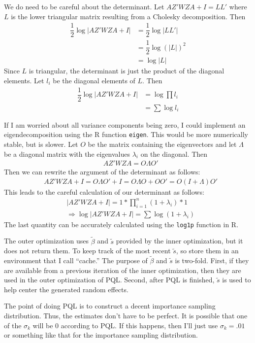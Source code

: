 \documentclass{article}
\begin{document}
We do need to be careful about the determinant. Let $AZ' W ZA +I= LL'$ where $L$ is the lower triangular matrix resulting from a Cholesky decomposition. Then
\begin{align}
\dfrac{1}{2} \log | AZ' W ZA +I | &= \dfrac{1}{2} \log |LL'|\\
&=\dfrac{1}{2} \log (|L|)^2 \\
&= \log |L|
\end{align}
Since $L$ is triangular, the determinant is just the product of the diagonal elements. Let $l_i$ be the diagonal elements of $L$. Then
\begin{align}
\dfrac{1}{2} \log | AZ' W ZA +I | &= \log \prod l_i \\
&= \sum \log l_i
\end{align}

 If I am worried about all variance components being zero, I could implement an eigendecomposition using the R function \texttt{eigen}. This would be more numerically stable, but is slower. Let $O$ be the matrix containing the eigenvectors and let $\Lambda$ be a diagonal matrix with the eigenvalues $\lambda_i$ on the diagonal. Then
\begin{align}
 &AZ' W ZA = O \Lambda O' 
\end{align}
Then we can rewrite the argument of the determinant as follows:
\begin{align}
& AZ' W ZA +I  = O \Lambda O' + I = O \Lambda O + OO'=O (I+\Lambda) O' 
\end{align}
This leads to the careful calculation of our determinant as follows:
\begin{align}
&   \left| AZ' W ZA +I \right| = 1 *  \prod_{i=1}^n (1+\lambda_i) *1\\
&\Rightarrow \log   | AZ' W ZA +I | = \sum \log(1+\lambda_i) 
\end{align}
The last quantity can be accurately calculated using the \texttt{log1p} function in R.

The outer optimization  uses $\tilde{\beta}$ and $\tilde{s}$ provided by the inner optimization, but it does not return them. To keep track of the most recent  $\tilde{s}$, so store them in an environment that I call ``cache.''  The purpose of  $\tilde{\beta}$ and $\tilde{s}$ is two-fold. First, if they are available from a previous iteration of the inner optimization, then they are used in the outer optimization of PQL.  Second, after PQL is finished, $\tilde{s}$ is used to help center the generated random effects.


The point of doing PQL is to construct a decent importance sampling distribution. Thus, the estimates don't have to be perfect.  It is possible that one of the $\sigma_k$ will be 0 according to PQL. If this happens, then I'll just use $\sigma_k = .01$ or something like that for the importance sampling distribution.
\end{document}
